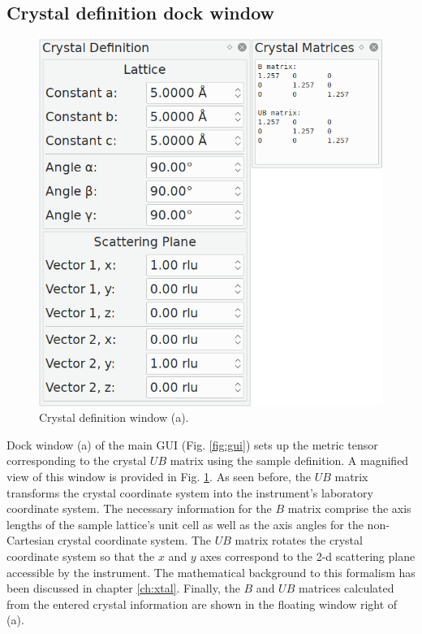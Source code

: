 \subsection{Crystal definition dock window}
\label{sec:gui_xtal}
\begin{minipage}{1 \textwidth}
\setlength{\intextsep}{0.25cm}
\begin{figure}
	\vspace{-0.25cm}
	\includegraphics[width = 0.45 \textwidth]{figures/gui_xtal}
	\caption[Crystal definition window.]{Crystal definition window (a).
		\label{fig:gui_xtal}}
\end{figure}

Dock window (a) of the main GUI (Fig. \ref{fig:gui}) sets up the metric tensor corresponding 
to the crystal $UB$ matrix using the sample definition.
A magnified view of this window is provided in Fig. \ref{fig:gui_xtal}. 
As seen before, the $UB$ matrix transforms the crystal coordinate system into the instrument's 
laboratory coordinate system.
The necessary information for the $B$ matrix comprise the axis lengths of the sample lattice's
unit cell as well as the axis angles for the non-Cartesian crystal coordinate system.
The $UB$ matrix rotates the crystal coordinate system so that the $x$ and $y$ axes correspond
to the 2-d scattering plane accessible by the instrument.
The mathematical background to this formalism has been discussed in chapter \ref{ch:xtal}.
Finally, the $B$ and $UB$ matrices calculated from the entered crystal information are shown 
in the floating window right of (a).
\end{minipage}
\vspace{0.5cm}



